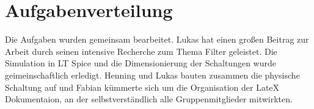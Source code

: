 \section{Aufgabenverteilung}

Die Aufgaben wurden gemeinsam bearbeitet. Lukas hat einen großen Beitrag zur Arbeit durch seinen intensive Recherche zum Thema Filter geleistet. Die Simulation in LT Spice und die Dimensionierung der Schaltungen wurde geimeinschaftlich erledigt. Henning und Lukas bauten zusammen die physische Schaltung auf und Fabian kümmerte sich um die Organisation der LateX Dokumentaion, an der selbstverständlich alle Gruppenmitglieder mitwirkten.